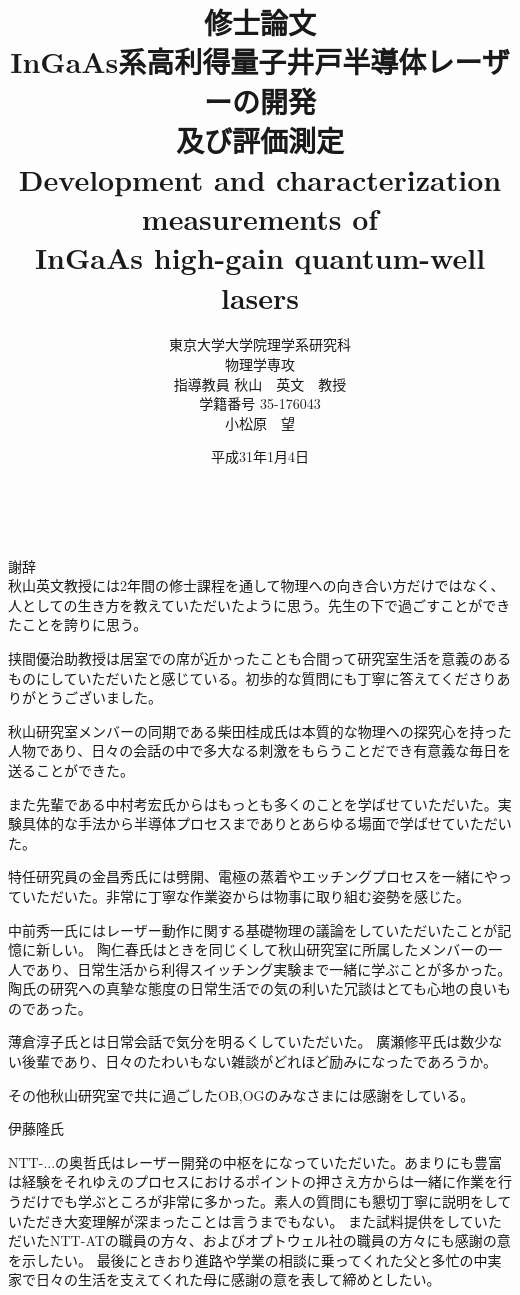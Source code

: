 \documentclass[11pt]{jreport}
\title{
{\LARGE 修士論文\\[1cm]}
{\huge InGaAs系高利得量子井戸半導体レーザーの開発\\及び評価測定\\[1cm]
Development and characterization measurements of \\InGaAs high-gain quantum-well
lasers\\[5cm]}
}
\date{\LARGE 平成31年1月4日}
\author{\LARGE 東京大学大学院理学系研究科\\
\LARGE 物理学専攻\\[1cm]
\LARGE 指導教員 秋山　英文　教授\\[1cm]
\LARGE 学籍番号 35-176043\\
\LARGE 小松原　望}
\begin{document}
\maketitle			%
\tableofcontents 	%
\listoffigures 		%
\listoftables　		%



謝辞\\
秋山英文教授には2年間の修士課程を通して物理への向き合い方だけではなく、人としての生き方を教えていただいたように思う。先生の下で過ごすことができたことを誇りに思う。


挟間優治助教授は居室での席が近かったことも合間って研究室生活を意義のあるものにしていただいたと感じている。初歩的な質問にも丁寧に答えてくださりありがとうございました。


秋山研究室メンバーの同期である柴田桂成氏は本質的な物理への探究心を持った人物であり、日々の会話の中で多大なる刺激をもらうことだでき有意義な毎日を送ることができた。


また先輩である中村考宏氏からはもっとも多くのことを学ばせていただいた。実験具体的な手法から半導体プロセスまでありとあらゆる場面で学ばせていただいた。


特任研究員の金昌秀氏には劈開、電極の蒸着やエッチングプロセスを一緒にやっていただいた。非常に丁寧な作業姿からは物事に取り組む姿勢を感じた。




中前秀一氏にはレーザー動作に関する基礎物理の議論をしていただいたことが記憶に新しい。
陶仁春氏はときを同じくして秋山研究室に所属したメンバーの一人であり、日常生活から利得スイッチング実験まで一緒に学ぶことが多かった。陶氏の研究への真摯な態度の日常生活での気の利いた冗談はとても心地の良いものであった。


薄倉淳子氏とは日常会話で気分を明るくしていただいた。
廣瀬修平氏は数少ない後輩であり、日々のたわいもない雑談がどれほど励みになったであろうか。


その他秋山研究室で共に過ごしたOB,OGのみなさまには感謝をしている。


伊藤隆氏


NTT-...の奥哲氏はレーザー開発の中枢をになっていただいた。あまりにも豊富は経験をそれゆえのプロセスにおけるポイントの押さえ方からは一緒に作業を行うだけでも学ぶところが非常に多かった。素人の質問にも懇切丁寧に説明をしていただき大変理解が深まったことは言うまでもない。
また試料提供をしていただいたNTT-ATの職員の方々、およびオプトウェル社の職員の方々にも感謝の意を示したい。
最後にときおり進路や学業の相談に乗ってくれた父と多忙の中実家で日々の生活を支えてくれた母に感謝の意を表して締めとしたい。

\end{document}
